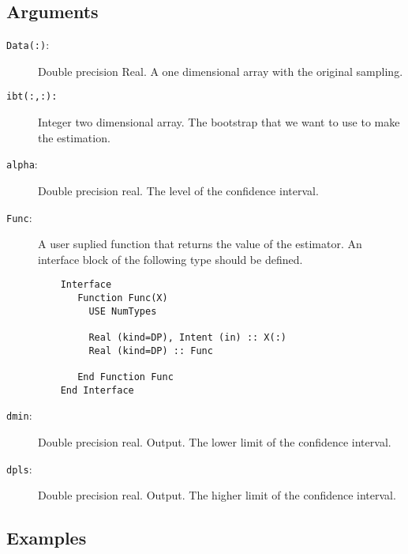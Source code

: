 \subsection{Arguments}

\begin{description}
\item[\texttt{Data(:)}:] Double precision Real. A one dimensional
  array with the original sampling.
\item[\texttt{ibt(:,:): }] Integer two dimensional array. The bootstrap
  that we want to use to make the estimation.
\item[\texttt{alpha}: ] Double precision real. The level of the
  confidence interval. 
\item[\texttt{Func}: ] A user suplied function that returns the value
  of the estimator. An interface block of the following type should be
  defined. 
\begin{verbatim}
    Interface 
       Function Func(X)
         USE NumTypes
         
         Real (kind=DP), Intent (in) :: X(:)
         Real (kind=DP) :: Func

       End Function Func
    End Interface
\end{verbatim}
\item[\texttt{dmin}: ] Double precision real. Output. The lower limit
  of the confidence interval.
\item[\texttt{dpls}: ] Double precision real. Output. The higher limit
  of the confidence interval.
\end{description}

\subsection{Examples}


